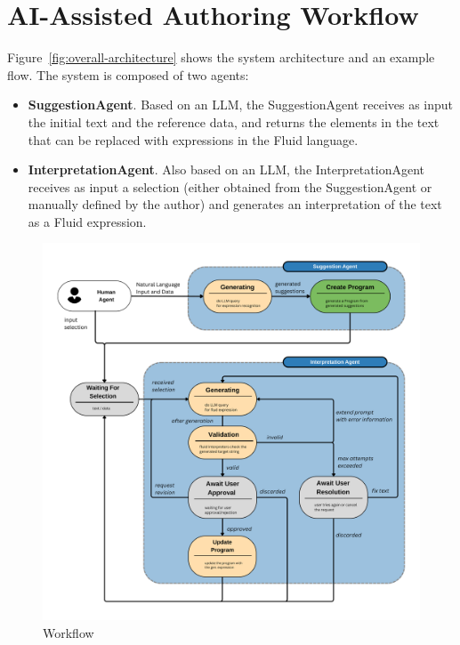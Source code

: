 \section{AI-Assisted Authoring Workflow}
\label{sec:authoring-workflow}

Figure~\ref{fig:overall-architecture} shows the system architecture and an example flow.
The system is composed of two agents:

\begin{itemize}
    \item \textbf{SuggestionAgent}. Based on an LLM, the SuggestionAgent receives as input the initial text and the reference data, and returns the elements in the text that can be replaced with expressions in the Fluid language.
    \item \textbf{InterpretationAgent}. Also based on an LLM, the InterpretationAgent receives as input a selection (either obtained from the SuggestionAgent or manually defined by the author) and generates an interpretation of the text as a Fluid expression.
\end{itemize}

\begin{figure}
    \centering
    \includegraphics[width=\linewidth]{fig/entire-workflow}
    \caption{Workflow}\label{fig:architecture}
\end{figure}

